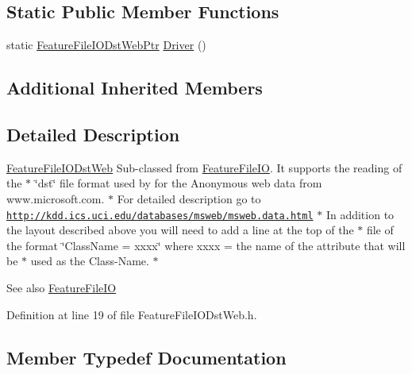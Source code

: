 \subsection*{Static Public Member Functions}
\begin{DoxyCompactItemize}
\item 
static \hyperlink{class_k_k_m_l_l_1_1_feature_file_i_o_dst_web_a0be9243e024b5178e3a037517d1e37e3}{Feature\+File\+I\+O\+Dst\+Web\+Ptr} \hyperlink{class_k_k_m_l_l_1_1_feature_file_i_o_dst_web_a02c015ca2367532cfce082d7f85a7099}{Driver} ()
\end{DoxyCompactItemize}
\subsection*{Additional Inherited Members}


\subsection{Detailed Description}
\hyperlink{class_k_k_m_l_l_1_1_feature_file_i_o_dst_web}{Feature\+File\+I\+O\+Dst\+Web} Sub-\/classed from \hyperlink{class_k_k_m_l_l_1_1_feature_file_i_o}{Feature\+File\+IO}. It supports the reading of the $\ast$ \char`\"{}dst\char`\"{} file format used by for the Anonymous web data from www.\+microsoft.\+com. $\ast$ For detailed description go to \href{http://kdd.ics.uci.edu/databases/msweb/msweb.data.html}{\tt http\+://kdd.\+ics.\+uci.\+edu/databases/msweb/msweb.\+data.\+html} $\ast$ In addition to the layout described above you will need to add a line at the top of the $\ast$ file of the format \char`\"{}\+Class\+Name = xxxx\char`\"{} where xxxx = the name of the attribute that will be $\ast$ used as the Class-\/\+Name. $\ast$

\begin{DoxySeeAlso}{See also}
\hyperlink{class_k_k_m_l_l_1_1_feature_file_i_o}{Feature\+File\+IO} 
\end{DoxySeeAlso}


Definition at line 19 of file Feature\+File\+I\+O\+Dst\+Web.\+h.



\subsection{Member Typedef Documentation}
